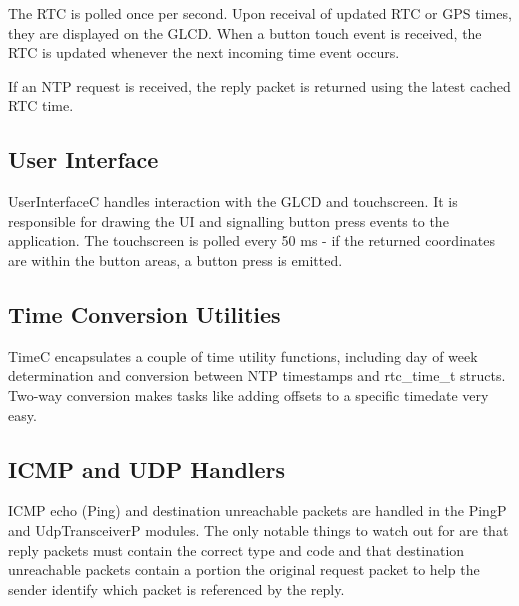 \documentclass[12pt,a4paper,titlepage,oneside]{article}
\begin{document}
The RTC is polled once per second. Upon receival of updated RTC or GPS times,
they are displayed on the GLCD. When a button touch event is received, the RTC
is updated whenever the next incoming time event occurs.

If an NTP request is received, the reply packet is returned using the latest
cached RTC time.

\subsection{User Interface}

UserInterfaceC handles interaction with the GLCD and touchscreen. It is
responsible for drawing the UI and signalling button press events to the
application. The touchscreen is polled every 50 ms - if the returned
coordinates are within the button areas, a button press is emitted.

\subsection{Time Conversion Utilities}

TimeC encapsulates a couple of time utility functions, including day of week
determination and conversion between NTP timestamps and rtc\_time\_t structs.
Two-way conversion makes tasks like adding offsets to a specific timedate very
easy.

\subsection{ICMP and UDP Handlers}

ICMP echo (Ping) and destination unreachable packets are handled in the PingP
and UdpTransceiverP modules. The only notable things to watch out for are that
reply packets must contain the correct type and code and that destination
unreachable packets contain a portion the original request packet to help the
sender identify which packet is referenced by the reply.

\end{document}
